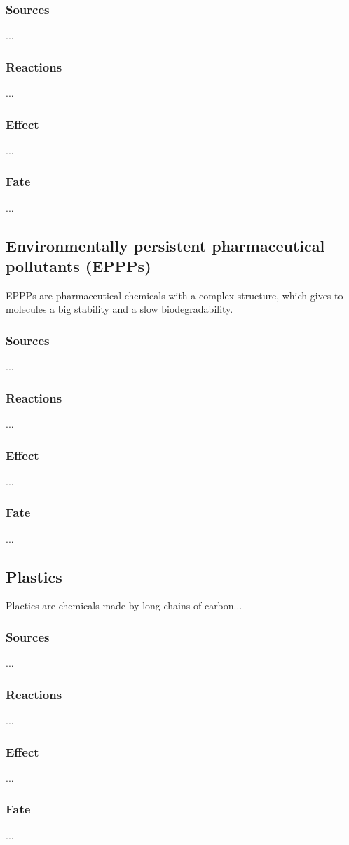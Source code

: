 \documentclass{article}
\begin{document}
\subsubsection{Sources}
...

\subsubsection{Reactions}
...

\subsubsection{Effect}
...

\subsubsection{Fate}
... 

\subsection{Environmentally persistent pharmaceutical pollutants (EPPPs)}
EPPPs are pharmaceutical chemicals with a complex structure, which gives to
molecules a big stability and a slow biodegradability.

\subsubsection{Sources}
...

\subsubsection{Reactions}
...

\subsubsection{Effect}
...

\subsubsection{Fate}
... 

\subsection{Plastics}
Plactics are chemicals made by long chains of carbon...

\subsubsection{Sources}
...

\subsubsection{Reactions}
...

\subsubsection{Effect}
...

\subsubsection{Fate}
... 
\end{document}
